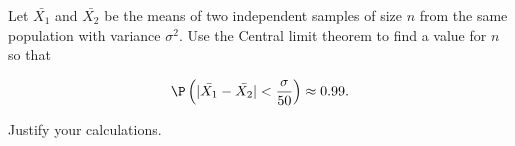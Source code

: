 
\begin{exercise}

Let $\bar{X_1}$ and $\bar{X_2}$ be the means of two independent samples of size $n$
from the same population with variance $\sigma^2$. Use the Central limit theorem to find
a value for $n$ so that

\begin{align*}
  \P\left(|\bar{X_1} - \bar{X_2}| < \frac{\sigma}{50}\right) \approx 0.99.
\end{align*}

Justify your calculations.

\end{exercise}


